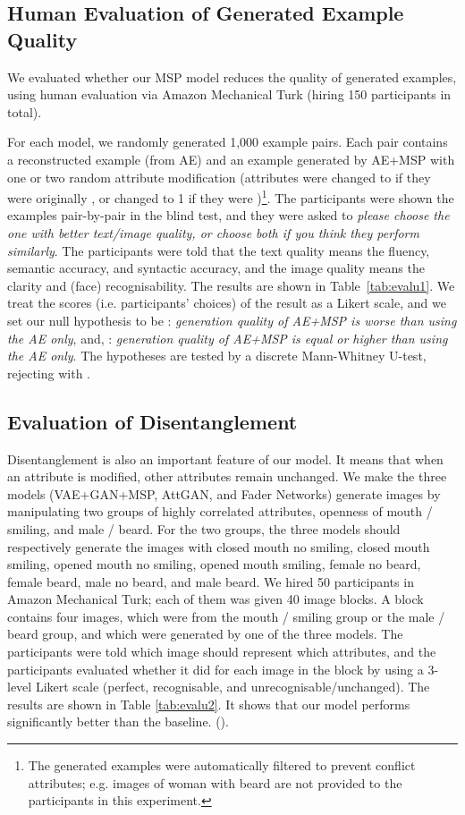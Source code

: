 \documentclass{article}
\begin{document}
\subsection{Human Evaluation of Generated Example Quality}

We evaluated whether our MSP model reduces the quality of  generated examples, using human evaluation via Amazon Mechanical Turk (hiring 150 participants in total).

For each model, we randomly generated 1,000 example pairs. Each pair contains a reconstructed example (from AE) and an example generated by AE+MSP with one or two random attribute modification (attributes were changed to  if they were originally , or changed to 1 if they were )\footnote{The generated examples were automatically filtered to prevent conflict attributes; e.g. images of woman with beard are not provided to the participants in this experiment.}. The participants were shown the examples pair-by-pair in the blind test, and they were asked to \textit{please choose the one with better text/image quality, or choose both if you think they perform similarly}. The participants were told that the text quality means the fluency, semantic accuracy, and syntactic accuracy, and the image quality means the clarity and (face) recognisability. The results are shown in Table~\ref{tab:evalu1}.
We treat the scores (i.e. participants' choices) of the result as a Likert scale, and we set our null hypothesis to be : \textit{generation quality of AE+MSP is worse than using the AE only}, and, : \textit{generation quality of AE+MSP is equal or higher than using the AE only}. The hypotheses are tested by a discrete Mann-Whitney U-test, rejecting   with .






\subsection{Evaluation of Disentanglement}

Disentanglement is also an important feature of our model. It means that when an attribute is modified, other attributes remain unchanged. 
We make the three models (VAE+GAN+MSP, AttGAN, and Fader Networks) generate images by manipulating two groups of highly correlated attributes, openness of mouth / smiling, and male / beard. 
For the two groups, the three models should respectively generate the images with closed mouth  no smiling, closed mouth  smiling, opened mouth  no smiling, opened mouth  smiling, female  no beard, female  beard, male  no beard, and male  beard. We hired 50 participants in Amazon Mechanical Turk; each of them was given 40 image blocks. A block contains four images, which were from the mouth / smiling group or the male / beard group, and which were generated by one of the three models. The participants were told which image should represent which attributes, and the participants evaluated whether it did for  each image in the block by using a 3-level Likert scale (perfect, recognisable, and unrecognisable/unchanged). The results are shown in Table \ref{tab:evalu2}. It shows that our model performs significantly better than the baseline. ().
\end{document}
